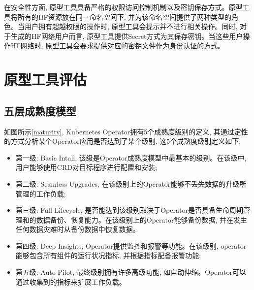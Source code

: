 在安全性方面, 原型工具具备严格的权限访问控制机制以及密钥保存方式。原型工具将所有的HF资源放在同一命名空间下, 并为该命名空间提供了两种类型的角色。当用户拥有超越权限的操作时, 原型工具会提示并不进行相关操作。同时, 对于生成的HF网络用户而言, 原型工具提供Secret方式为其保存密钥。当这些用户操作HF网络时, 原型工具会要求提供对应的密钥文件作为身份认证的方式。

\section{原型工具评估}

\subsection{五层成熟度模型}

如图所示\ref{maturity}, Kubernetes Operator拥有5个成熟度级别的定义\cite{duan2021case}, 其通过定性的方式分析某个Operator应用是否达到了某个级别, 这5个成熟度级别定义如下:

\begin{itemize}[itemindent=2em]
    \item 第一级: Basic Intall, 该级是Operator成熟度模型中最基本的级别。在该级中, 用户能够使用CRD对目标程序进行配置和安装;

    \item 第二级: Seamless Upgrades, 在该级别上的Operator能够不丢失数据的升级所管理的工作负载;

    \item 第三级: Full Lifecycle, 是否能达到该级别取决于Operator是否具备生命周期管理和的数据备份、恢复能力。在该级别上的Operator能够备份数据, 并在发生任何数据灾难时从备份数据中恢复数据。

    \item 第四级: Deep Insights, Operator提供监控和报警等功能。在该级别, operator能够包含所有组件的运行状况指标, 并根据指标配备报警功能;

    \item 第五级: Auto Pilot, 最终级别拥有许多高级功能, 如自动伸缩。Operator可以通过收集到的指标来扩展工作负载。

\end{itemize}

